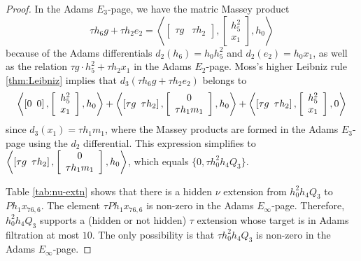 \begin{proof}
In the Adams $E_3$-page, we have the matric Massey product
\[
\tau h_6 g + \tau h_2 e_2 =
\left\langle 
\left[
\begin{array}{cc}
\tau g & \tau h_2
\end{array}
\right],
\left[
\begin{array}{c}
h_5^2 \\ x_1
\end{array}
\right],
h_0
\right\rangle
\]
because of the Adams differentials
$d_2(h_6) = h_0 h_5^2$ and
$d_2(e_2) = h_0 x_1$, as well as the relation
$\tau g \cdot h_5^2 + \tau h_2 x_1$ in the Adams $E_2$-page.
Moss's higher Leibniz rule \ref{thm:Leibniz}
implies that 
$d_3(\tau h_6 g + \tau h_2 e_2)$ 
belongs to
\[
\left\langle
\left[
0 \enskip 0
\right],
\left[
\begin{array}{c}
h_5^2 \\ x_1
\end{array}
\right],
h_0 \right\rangle +
\left\langle
\left[
\tau g \enskip \tau h_2
\right],
\left[
\begin{array}{c}
0 \\ \tau h_1 m_1
\end{array}
\right],
h_0 \right\rangle +
\left\langle
\left[
\tau g \enskip \tau h_2
\right],
\left[
\begin{array}{c}
h_5^2 \\ x_1
\end{array}
\right],
0 \right\rangle
\]
since $d_3(x_1) = \tau h_1 m_1$,
where the Massey products are formed in the Adams $E_3$-page using
the $d_2$ differential.
This expression simplifies to
$\left\langle
\left[
\tau g \enskip \tau h_2
\right],
\left[
\begin{array}{c}
0 \\ \tau h_1 m_1
\end{array}
\right],
h_0 \right\rangle$,
which equals $\{0, \tau h_0^2 h_4 Q_3 \}$.

Table \ref{tab:nu-extn} shows that there is a hidden $\nu$
extension from $h_0^2 h_4 Q_3$ to $P h_1 x_{76,6}$.
The element $\tau P h_1 x_{76,6}$ is non-zero in the Adams
$E_\infty$-page.  Therefore,
$h_0^2 h_4 Q_3$ supports a (hidden or not hidden) 
$\tau$ extension whose target is in Adams filtration at most $10$.
The only possibility is that
$\tau h_0^2 h_4 Q_3$ is non-zero in the Adams 
$E_\infty$-page.
\end{proof}


